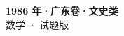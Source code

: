 \documentclass[zihao=-4, a4paper]{ctexart}
\begin{document}
\begin{center}
  {\Large\bfseries 1986 年·广东卷·文史类}\\[4pt]
  {\large 数学 · 试题版}
\end{center}
\medskip
{}

\end{document}
